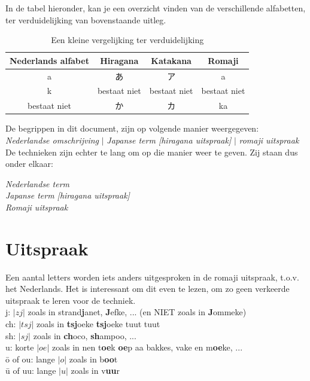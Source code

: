 \documentclass[12pt]{scrartcl}
\begin{document}
\begin{CJK*}{UTF8}{min}
\noindent In de tabel hieronder, kan je een overzicht vinden van de verschillende alfabetten, ter verduidelijking van bovenstaande uitleg.\\

\begin{table}[H]
\begin{center}
\begin{tabular}{c|c|c|c}
Nederlands alfabet & Hiragana & Katakana & Romaji\\
\hline
a &  あ & ア & a\\
k & bestaat niet & bestaat niet & bestaat niet\\
bestaat niet & か & カ & ka
\end{tabular}
\end{center}
\caption{Een kleine vergelijking ter verduidelijking}
\label{vergelijking_alfabetten}
\end{table}

\noindent De begrippen in dit document, zijn op volgende manier weergegeven:\\

\textit{Nederlandse omschrijving} $|$ \textit{Japanse term [hiragana uitspraak]} $|$ \textit{romaji uitspraak}\\

\noindent De technieken zijn echter te lang om op die manier weer te geven. Zij staan dus onder elkaar:\\

\begin{center}
\textit{Nederlandse term}\\
\textit{Japanse term [hiragana uitspraak]}\\
\textit{Romaji uitspraak}
\end{center}

\section{Uitspraak}
\noindent Een aantal letters worden iets anders uitgesproken in de romaji uitspraak, t.o.v. het Nederlands.
Het is interessant om dit even te lezen, om zo geen verkeerde uitspraak te leren voor de techniek.\\

\noindent j: $|zj|$ zoals in strand\textbf{j}anet, \textbf{J}efke, ... (en NIET zoals in \textbf{J}ommeke)\\
ch: $|tsj|$ zoals in \textbf{tsj}oeke \textbf{tsj}oeke tuut tuut\\
sh: $|sj|$ zoals in \textbf{ch}oco, \textbf{sh}ampoo, ...\\
u: korte $|oe|$ zoals in nen t\textbf{oe}k \textbf{oe}p aa bakkes, vake en m\textbf{oe}ke, ...\\
\={o} of ou: lange $|o|$ zoals in b\textbf{oo}t\\
\={u} of uu: lange $|u|$ zoals in v\textbf{uu}r


\end{CJK*}
\end{document}
